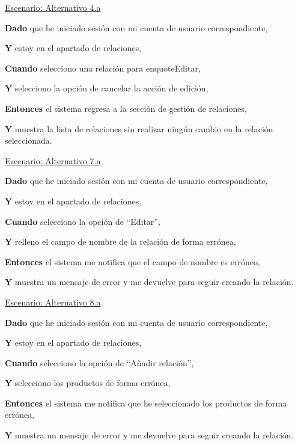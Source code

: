 \underline{Escenario: Alternativo 4.a}\par
\vspace{0.15cm}

\textbf{Dado} que he iniciado sesión con mi cuenta de usuario correspondiente,\par
\textbf{Y} estoy en el apartado de relaciones,\par
\textbf{Cuando} selecciono una relación para enquote{Editar},\par
\textbf{Y} selecciono la opción de cancelar la acción de edición,\par
\textbf{Entonces} el sistema regresa a la sección de gestión de relaciones,\par
\textbf{Y} muestra la lista de relaciones sin realizar ningún cambio en la relación seleccionada.\par

\underline{Escenario: Alternativo 7.a}\par
\vspace{0.15cm}

\textbf{Dado} que he iniciado sesión con mi cuenta de usuario correspondiente,\par
\textbf{Y} estoy en el apartado de relaciones,\par
\textbf{Cuando} selecciono la opción de \enquote{Editar},\par
\textbf{Y} relleno el campo de nombre de la relación de forma errónea,\par
\textbf{Entonces} el sistema me notifica que el campo de nombre es erróneo,\par
\textbf{Y} muestra un mensaje de error y me devuelve para seguir creando la relación.\par

\vspace{0.20cm}

\underline{Escenario: Alternativo 8.a}\par
\vspace{0.15cm}

\textbf{Dado} que he iniciado sesión con mi cuenta de usuario correspondiente,\par
\textbf{Y} estoy en el apartado de relaciones,\par
\textbf{Cuando} selecciono la opción de \enquote{Añadir relación},\par
\textbf{Y} selecciono los productos de forma errónea,\par
\textbf{Entonces} el sistema me notifica que he seleccionado los productos de forma errónea,\par
\textbf{Y} muestra un mensaje de error y me devuelve para seguir creando la relación.\par

